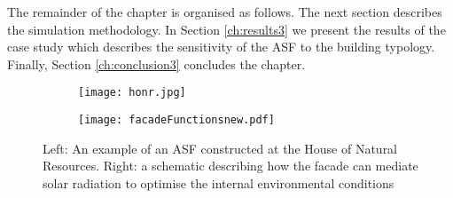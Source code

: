The remainder of the chapter is organised as follows. The next section describes the simulation methodology. In Section \ref{ch:results3} we present the results of the case study which describes the sensitivity of the ASF to the building typology. Finally, Section \ref{ch:conclusion3} concludes the chapter.

\begin{figure}
    \centering
    \begin{subfigure}[b]{0.47\textwidth}
        \texttt{[image: honr.jpg]}
		\label{fig:HoNR}
    \end{subfigure} \hfill
    \begin{subfigure}[b]{0.47\textwidth}
        \texttt{[image: facadeFunctionsnew.pdf]}
		\label{fig:ASFschematic3}
    \end{subfigure}
    \caption{Left: An example of an ASF constructed at the House of Natural Resources. Right: a schematic describing how the facade can mediate solar radiation to optimise the internal environmental conditions \cite{nagy2016adaptive}}
    \label{fig:introduction3}
\end{figure}









